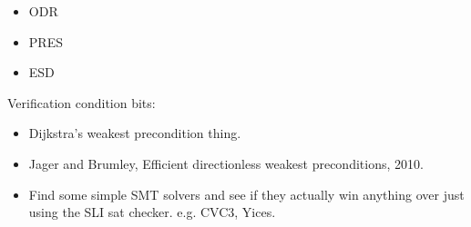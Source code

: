 \begin{itemize}
\item ODR
\item PRES
\item ESD
\end{itemize}



Verification condition bits:

\begin{itemize}
\item
  Dijkstra's weakest precondition thing.
\item
  Jager and Brumley, Efficient directionless weakest preconditions, 2010.
\item
  Find some simple SMT solvers and see if they actually win anything over just using the SLI sat checker.
  e.g. CVC3, Yices.
\end{itemize}
